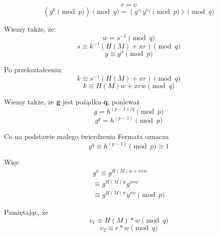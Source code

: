 \documentclass[11pt]{article}
\begin{document}
\begin{equation*}
  r = v
\end{equation*}
\begin{equation*}
  (g^{k} \pmod p) \pmod q = (g^{v_{1}}y^{v_{2}} \pmod p) \pmod q
\end{equation*}

Wiemy także, że:
\begin{equation*}
  w = s^{-1} \pmod q
\end{equation*}
\begin{equation*}
  s \equiv k^{-1}(H(M) + xr) \pmod q
\end{equation*}
\begin{equation*}
  y \equiv g^{x} \pmod p
\end{equation*}

Po przekształceniu:
\begin{equation*}
  k \equiv s^{-1}(H(M) + xr) \pmod q
\end{equation*}
\begin{equation*}
  k \equiv H(M)w + xrw \pmod q
\end{equation*}

Wiemy także, że \textbf{g} jest pożądku \textbf{q}, ponieważ
\begin{equation*}
    g = h^{(p-1)/q} \pmod p
\end{equation*}
\begin{equation*}
    g^q = h^{(p-1)} \pmod p
\end{equation*}

Co na podstawie małego twierdzenia Fermata oznacza
\begin{equation*}
    g^q \equiv h^{(p-1)} \pmod p \equiv 1
\end{equation*}

Więc
\begin{equation*}
  \begin{aligned}
    g^{k} \equiv g^{H(M)w + xrw} \\ \equiv g^{H(M)w} g^{xrw} \\ \equiv g^{H(M)w} y^{rw} \pmod p
  \end{aligned}
\end{equation*}

Pamiętając, że
\begin{equation*}
  v_{1} \equiv H(M) * w \pmod q
\end{equation*}
\begin{equation*}
  v_{2} \equiv r * w \pmod q
\end{equation*}
\end{document}
